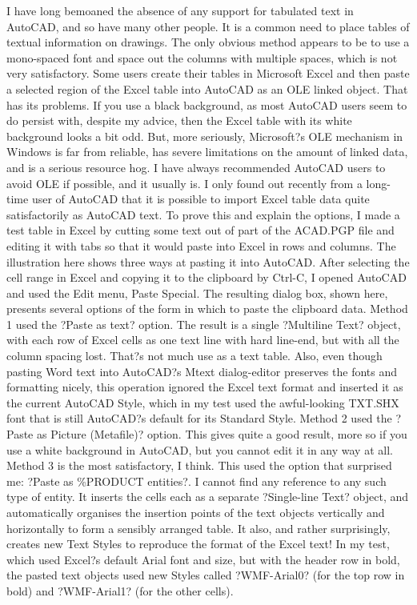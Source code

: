 \documentclass[a4paper]{article}
\newcommand\partfour[1]{{  \fontspec{AMELIA.TTF} \fontsize{14}{28} \selectfont #1}}
\begin{document}
\partfour{
I have long bemoaned the absence of any support for tabulated text in AutoCAD, and so have many other people. It is a common need to place tables of textual information on drawings. The only obvious method appears to be to use a mono-spaced font and space out the columns with multiple spaces, which is not very satisfactory.
Some users create their tables in Microsoft Excel and then paste a selected region of the Excel table into AutoCAD as an OLE linked object. That has its problems. If you use a black background, as most AutoCAD users seem to do persist with, despite my advice, then the Excel table with its white background looks a bit odd. But, more seriously, Microsoft?s OLE mechanism in Windows is far from reliable, has severe limitations on the amount of linked data, and is a serious resource hog. I have always recommended AutoCAD users to avoid OLE if possible, and it usually is.
I only found out recently from a long-time user of AutoCAD that it is possible to import Excel table data quite satisfactorily as AutoCAD text. To prove this and explain the options, I made a test table in Excel by cutting some text out of part of the ACAD.PGP file and editing it with tabs so that it would paste into Excel in rows and columns. The illustration here shows three ways at pasting it into AutoCAD. After selecting the cell range in Excel and copying it to the clipboard by Ctrl-C, I opened AutoCAD and used the Edit menu, Paste Special. The resulting dialog box, shown here, presents several options of the form in which to paste the clipboard data.
Method 1 used the ?Paste as text? option. The result is a single ?Multiline Text? object, with each row of Excel cells as one text line with hard line-end, but with all the column spacing lost. That?s not much use as a text table. Also, even though pasting Word text into AutoCAD?s Mtext dialog-editor preserves the fonts and formatting nicely, this operation ignored the Excel text format and inserted it as the current AutoCAD Style, which in my test used the awful-looking TXT.SHX font that is still AutoCAD?s default for its Standard Style.
Method 2 used the ?Paste as Picture (Metafile)? option. This gives quite a good result, more so if you use a white background in AutoCAD, but you cannot edit it in any way at all. 
Method 3 is the most satisfactory, I think. This used the option that surprised me: ?Paste as \%PRODUCT entities?. I cannot find any reference to any such type of entity. It inserts the cells each as a separate ?Single-line Text? object, and automatically organises the insertion points of the text objects vertically and horizontally to form a sensibly arranged table. It also, and rather surprisingly, creates new Text Styles to reproduce the format of the Excel text! In my test, which used Excel?s default Arial font and size, but with the header row in bold, the pasted text objects used new Styles called ?WMF-Arial0? (for the top row in bold) and ?WMF-Arial1? (for the other cells).
}
\end{document}
